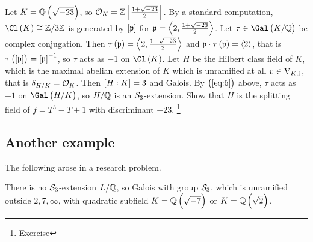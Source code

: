 \begin{example*}
Let $ K = \QQ\br{\sqrt{-23}} $, so $ \OOO_K = \ZZ\sbr{\tfrac{1 + \sqrt{-23}}{2}} $. By a standard computation, $ \Cl\br{K} \cong \ZZ / 3\ZZ $ is generated by $ \sbr{\ppp} $ for $ \mathfrak{p} = \left\langle 2, \tfrac{1 + \sqrt{-23}}{2} \right\rangle $. Let $ \tau \in \Gal\br{K / \QQ} $ be complex conjugation. Then $ \tau\br{\ppp} = \abr{2, \tfrac{1 - \sqrt{-23}}{2}} $ and $ \ppp \cdot \tau\br{\ppp} = \abr{2} $, that is $ \tau\br{\sbr{\ppp}} = \sbr{\ppp}^{-1} $, so $ \tau $ acts as $ -1 $ on $ \Cl\br{K} $. Let $ H $ be the Hilbert class field of $ K $, which is the maximal abelian extension of $ K $ which is unramified at all $ v \in \mathrm{V}_{K, \mathrm{f}} $, that is $ \delta_{H / K} = \mathcal{O}_K $. Then $ \sbr{H : K} = 3 $ and Galois. By $ \br{\ref{eq:5}} $ above, $ \tau $ acts as $ -1 $ on $ \Gal\br{H / K} $, so $ H / \mathbb{Q} $ is an $ \mathcal{S}_3 $-extension. Show that $ H $ is the splitting field of $ f = T^3 - T + 1 $ with discriminant $ -23 $. \footnote{Exercise}
\end{example*}

\pagebreak

\subsection{Another example}


The following arose in a research problem.

\begin{proposition}
There is no $ \mathcal{S}_3 $-extension $ L / \mathbb{Q} $, so Galois with group $ \mathcal{S}_3 $, which is unramified outside $ 2, 7, \infty $, with quadratic subfield $ K = \QQ\br{\sqrt{-7}} $ or $ K = \QQ\br{\sqrt{2}} $.
\end{proposition}

